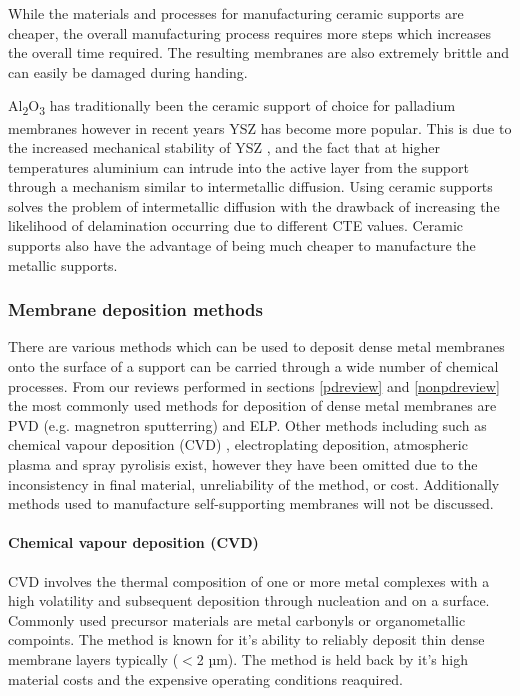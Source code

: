 While the materials and processes for manufacturing ceramic supports are cheaper, the overall manufacturing process requires more steps which increases the overall time required. The resulting membranes are also extremely brittle and can easily be damaged during handing. 

Al\textsubscript{2}O\textsubscript{3} has traditionally been the ceramic support of choice for palladium membranes however in recent years YSZ has become more popular. This is due to the increased mechanical stability of YSZ \cite{Hayashi2005}, and the fact that at higher temperatures aluminium can intrude into the active layer from the support through a mechanism similar to intermetallic diffusion.\cite{Atsonios2015} Using ceramic supports solves the problem of intermetallic diffusion with the drawback of increasing the likelihood of delamination occurring due to different CTE values. Ceramic supports also have the advantage of being much cheaper to manufacture the metallic supports. \cite{Atsonios2015}

\subsubsection{Membrane deposition methods}
There are various methods which can be used to deposit dense metal membranes onto the surface of a support can be carried through a wide number of chemical processes. From our reviews performed in sections \ref{pdreview} and \ref{nonpdreview} the most commonly used methods for deposition of dense metal membranes are PVD (e.g. magnetron sputterring) and ELP. Other methods including such as chemical vapour deposition (CVD) \cite{Yun2011a, Wang2006a, David2011a}, electroplating deposition, atmospheric plasma \cite{HUANG2007160} and spray pyrolisis \cite{LI1993247} exist, however they have been omitted due to the inconsistency in final material, unreliability of the method, or cost. Additionally methods used to manufacture self-supporting membranes will not be discussed.

\paragraph*{Chemical vapour deposition (CVD)}
CVD involves the thermal composition of one or more metal complexes with a high volatility and subsequent deposition through nucleation and on a surface. Commonly used precursor materials are metal carbonyls or organometallic compoints. The method is known for it's ability to reliably deposit thin dense membrane layers typically ($<$2 µm). The method is held back by it's high material costs and the expensive operating conditions reaquired.\cite{Yun2011a, Basile2008} 


